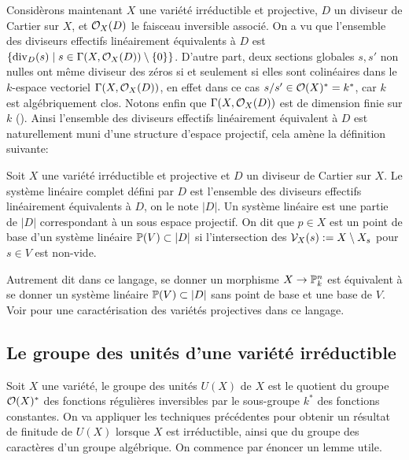 Considèrons maintenant $X$ une variété irréductible et projective, $D$ un diviseur de Cartier sur $X$, et $\mathcal{O}_X(D)$ le faisceau inversible associé. On a vu que l'ensemble des diviseurs effectifs linéairement équivalents à $D$ est $\lbrace \operatorname{div}_D(s)\mid s\in\Gamma(X,\mathcal{O}_X(D))\setminus\lbrace0\rbrace \rbrace$. D'autre part, deux sections globales $s, s'$ non nulles ont même diviseur des zéros si et seulement si elles sont colinéaires dans le $k$-espace vectoriel $\Gamma(X, \mathcal{O}_X(D))$, en effet dans ce cas $s/s'\in \mathcal{O}(X)^*=k^*$, car $k$ est algébriquement clos. Notons enfin que $\Gamma(X, \mathcal{O}_X(D))$ est de dimension finie sur $k$ (\cite[II.5.19]{Hartshorne}). Ainsi l'ensemble des diviseurs effectifs linéairement équivalent à $D$ est naturellement muni d'une structure d'espace projectif, cela amène la définition suivante:
\begin{defn}
Soit $X$ une variété irréductible et projective et $D$ un diviseur de Cartier sur $X$. Le système linéaire complet défini par $D$ est l'ensemble des diviseurs effectifs linéairement équivalents à $D$, on le note $|D|$. Un système linéaire est une partie de $|D|$ correspondant à un sous espace projectif. On dit que $p\in X$ est un point de base d'un système linéaire $\mathbb{P}(V)\subset |D|$ si l'intersection des $\mathcal{V}_X(s):=X\setminus X_s$ pour $s\in V$ est non-vide. 
\end{defn}

Autrement dit dans ce langage, se donner un morphisme $X\rightarrow \mathbb{P}^n_k$ est équivalent à se donner un système linéaire $\mathbb{P}(V)\subset |D|$ sans point de base et une base de $V$. Voir \cite[II.7.8.2]{Hartshorne} pour une caractérisation des variétés projectives dans ce langage.


\subsection{Le groupe des unités d'une variété irréductible}
\label{unitGroupFiniteType}


Soit $X$ une variété, le groupe des unités $U(X)$ de $X$ est le quotient du groupe $\mathcal{O}(X)^*$ des fonctions régulières inversibles par le sous-groupe $k^*$ des fonctions constantes. On va appliquer les techniques précédentes pour obtenir un résultat de finitude de $U(X)$ lorsque $X$ est irréductible, ainsi que du groupe des caractères d'un groupe algébrique. On commence par énoncer un lemme utile.

